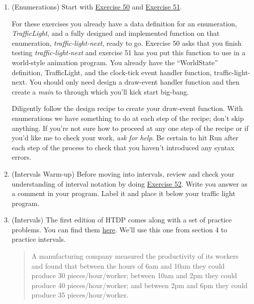 \documentclass[nobib]{tufte-handout}
\begin{document}
\begin{enumerate}
  \item (Enumerations) Start with \href{http://htdp.org/2018-01-06/Book/part_one.html#%28counter._%28exercise._cond2%29%29}{Exercise 50} and  \href{http://htdp.org/2018-01-06/Book/part_one.html#%28counter._%28exercise._cond3%29%29}{Exercise 51}.

  For these  exercises you already have a data definition for an enumeration, \textit{TrafficLight}, and a fully designed and implemented function on that enumeration, \textit{traffic-light-next}, ready to go.  Exercise 50 asks that you finish testing \textit{traffic-light-next} and exercise 51 has you put this function to use in a world-style animation program. You already have the ``WorldState'' definition, TrafficLight, and the clock-tick event handler function, traffic-light-next.  You should only need design a draw-event handler function and then create a \textit{main} to through which you'll kick start big-bang.

  Diligently follow the design recipe to create your draw-event function. With enumerations we have something to do at each step of the recipe; don't skip anything. If you're not sure how to proceed at any one step of the recipe or if you'd like me to check your work, \textit{ask for help}. Be certain to hit Run after each step of the process to check that you haven't introduced any syntax errors.

  \item (Intervals Warm-up) Before moving into intervals, review and check your understanding of interval notation by doing \href{http://htdp.org/2018-01-06/Book/part_one.html#%28counter._%28exercise._cond4%29%29}{Exercise 52}. Write you answer as a comment in your program. Label it and place it below your traffic light program.

  \item (Intervals) The first edition of HTDP comes along with a set of practice problems.  You can find them \href{http://htdp.org/2003-09-26/Problems/}{here}. We'll use this one from section 4 to practice intervals.
  \begin{quote}
    A manufacturing company measured the productivity of its workers and found that between the hours of 6am and 10am they could produce 30 pieces/hour/worker; between 10am and 2pm they could produce 40 pieces/hour/worker; and between 2pm and 6pm they could produce 35 pieces/hour/worker.


\end{quote}
\end{enumerate}
\end{document}
